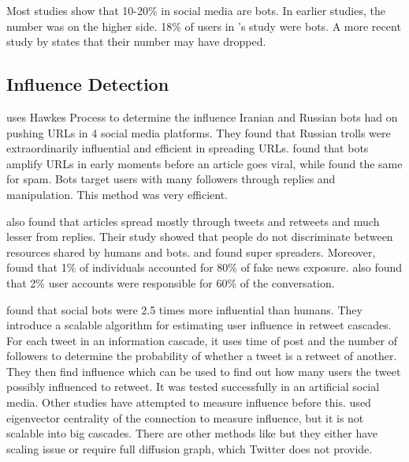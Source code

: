 \documentclass[letterpaper]{article}
\begin{document}
Most studies show that 10-20\% in social media are bots. In earlier studies, the number was on the higher side. 18\% of users in \cite{bovet2019influence}'s study were bots.
A more recent study by \cite{deb2019perils} states that their number may have dropped.

\subsection{Influence Detection}
\cite{zannettou2019let} uses Hawkes Process to determine the influence Iranian and Russian bots had on pushing URLs in 4 social media platforms. They found that Russian trolls were extraordinarily 
influential and efficient in spreading URLs. \cite{shao2018spread} found that bots amplify URLs in early moments before an article goes viral, while \cite{ferrara2018measuring} 
found the same for spam. Bots target users with many followers through replies and manipulation. This method was very efficient. \par


\cite{shao2018spread} also found that articles spread 
mostly through tweets and retweets and much lesser from replies. Their study showed that people do not discriminate between resources shared by humans and bots. 
\cite{shao2018spread} and \cite{grinberg2019fake} found super spreaders. Moreover,  \cite{grinberg2019fake} found that  1\% of individuals accounted for 80\% of fake news exposure. 
\cite{varol2017early} also found that 2\% user accounts were responsible for 60\% of the conversation. \par

\cite{rizoiu2018debatenight} found that social bots were 2.5 times more influential than humans. They introduce a scalable algorithm for estimating user influence in retweet cascades. 
For each tweet in an information cascade, it uses time of post and the number of followers to determine the probability of whether a tweet is a retweet of another. They then find influence which can be used 
to find out how many users the tweet possibly influenced to retweet. It was tested successfully in an artificial social media. Other studies have attempted to measure influence before this. 
\cite{weng2010twitterrank} used eigenvector centrality of the connection to measure influence, but it is not scalable into big cascades. There are other methods like 
\cite{rodriguez2011uncovering,cho2013latent,linderman2014discovering} but they either have scaling issue or require full diffusion graph, which Twitter does not provide.
\end{document}
